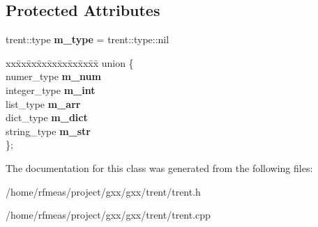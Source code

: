 \subsection*{Protected Attributes}
\begin{DoxyCompactItemize}
\item 
trent\+::type {\bfseries m\+\_\+type} = trent\+::type\+::nil\hypertarget{classgxx_1_1trent_a07eb4f4114ff9257bb64ce3d66d2a49b}{}\label{classgxx_1_1trent_a07eb4f4114ff9257bb64ce3d66d2a49b}

\item 
\begin{tabbing}
xx\=xx\=xx\=xx\=xx\=xx\=xx\=xx\=xx\=\kill
union \{\\
\>numer\_type {\bfseries m\_num}\\
\>integer\_type {\bfseries m\_int}\\
\>list\_type {\bfseries m\_arr}\\
\>dict\_type {\bfseries m\_dict}\\
\>string\_type {\bfseries m\_str}\\
\}; \hypertarget{classgxx_1_1trent_abe1ec03763e3fdca94866c65f55e8a41}{}\label{classgxx_1_1trent_abe1ec03763e3fdca94866c65f55e8a41}
\\

\end{tabbing}\end{DoxyCompactItemize}


The documentation for this class was generated from the following files\+:\begin{DoxyCompactItemize}
\item 
/home/rfmeas/project/gxx/gxx/trent/trent.\+h\item 
/home/rfmeas/project/gxx/gxx/trent/trent.\+cpp\end{DoxyCompactItemize}

